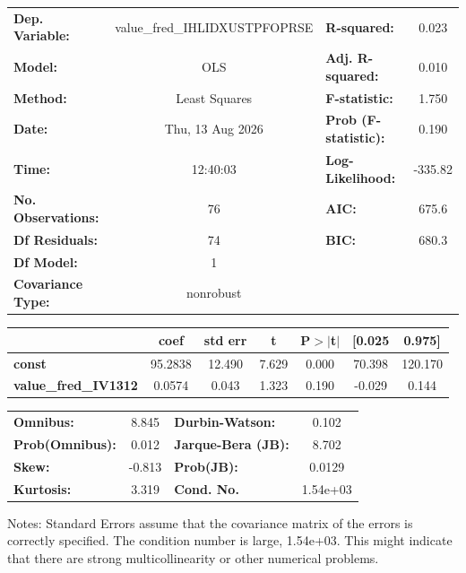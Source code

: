 \begin{center}
\begin{tabular}{lclc}
\toprule
\textbf{Dep. Variable:}      & value\_fred\_IHLIDXUSTPFOPRSE & \textbf{  R-squared:         } &     0.023   \\
\textbf{Model:}              &              OLS              & \textbf{  Adj. R-squared:    } &     0.010   \\
\textbf{Method:}             &         Least Squares         & \textbf{  F-statistic:       } &     1.750   \\
\textbf{Date:}               &        Thu, 13 Aug 2026       & \textbf{  Prob (F-statistic):} &    0.190    \\
\textbf{Time:}               &            12:40:03           & \textbf{  Log-Likelihood:    } &   -335.82   \\
\textbf{No. Observations:}   &                 76            & \textbf{  AIC:               } &     675.6   \\
\textbf{Df Residuals:}       &                 74            & \textbf{  BIC:               } &     680.3   \\
\textbf{Df Model:}           &                  1            & \textbf{                     } &             \\
\textbf{Covariance Type:}    &           nonrobust           & \textbf{                     } &             \\
\bottomrule
\end{tabular}
\begin{tabular}{lcccccc}
                             & \textbf{coef} & \textbf{std err} & \textbf{t} & \textbf{P$> |$t$|$} & \textbf{[0.025} & \textbf{0.975]}  \\
\midrule
\textbf{const}               &      95.2838  &       12.490     &     7.629  &         0.000        &       70.398    &      120.170     \\
\textbf{value\_fred\_IV1312} &       0.0574  &        0.043     &     1.323  &         0.190        &       -0.029    &        0.144     \\
\bottomrule
\end{tabular}
\begin{tabular}{lclc}
\textbf{Omnibus:}       &  8.845 & \textbf{  Durbin-Watson:     } &    0.102  \\
\textbf{Prob(Omnibus):} &  0.012 & \textbf{  Jarque-Bera (JB):  } &    8.702  \\
\textbf{Skew:}          & -0.813 & \textbf{  Prob(JB):          } &   0.0129  \\
\textbf{Kurtosis:}      &  3.319 & \textbf{  Cond. No.          } & 1.54e+03  \\
\bottomrule
\end{tabular}
\end{center}

Notes: \newline
 [1] Standard Errors assume that the covariance matrix of the errors is correctly specified. \newline
 [2] The condition number is large, 1.54e+03. This might indicate that there are \newline
 strong multicollinearity or other numerical problems.